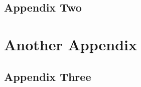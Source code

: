 \documentclass[phd,appendix,figures]{uithesis}
\begin{document}
\section{Appendix Two}
\blindtext

\chapter{Another Appendix}

\section{Appendix Three}
\blindtext



 
\end{document}

